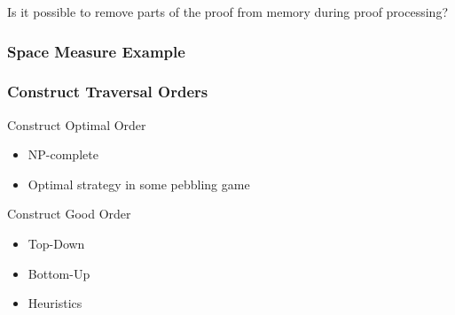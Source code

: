 \documentclass{beamer}
\begin{document}

\begin{frame}

Is it possible to remove parts of the proof from memory during proof processing?

\vspace{1cm}


\vspace{1cm}


\end{frame}

\begin{frame}
	\frametitle{Space Measure Example}
	
\end{frame}

\begin{frame}

\frametitle{Construct Traversal Orders}

\begin{block}{Construct Optimal Order}

\begin{itemize}

\item NP-complete
\item Optimal strategy in some pebbling game

\end{itemize}

\end{block}

\begin{block}{Construct Good Order}

\begin{itemize}
	\item Top-Down
	\item Bottom-Up
	\item Heuristics
\end{itemize}

\end{block}

\end{frame}
\end{document}
